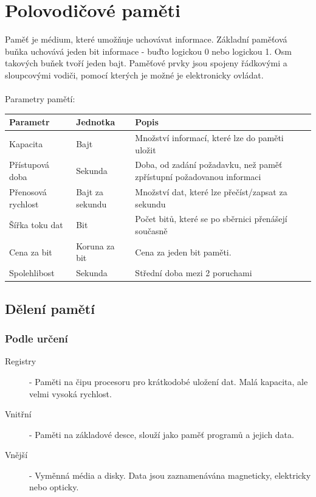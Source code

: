 \section{Polovodičové paměti}
\label{sec:polpameti}
Paměť je médium, které umožňuje uchovávat informace.
Základní paměťová buňka uchovává jeden bit informace - buďto logickou 0 nebo logickou 1.
Osm takových buňek tvoří jeden bajt.
Paměťové prvky jsou spojeny řádkovými a sloupcovými vodiči, pomocí kterých je možné je elektronicky ovládat.\\ \\
Parametry pamětí: \\
\begin{tabularx}{\linewidth}{l|l|l}
  \textbf{Parametr}  & \textbf{Jednotka} & \textbf{Popis}                                                        \\
  \hline
  Kapacita           & Bajt              & Množství informací, které lze do paměti uložit                        \\
  \hline
  Přístupová doba    & Sekunda           & Doba, od zadání požadavku, než paměť zpřístupní požadovanou informaci \\
  \hline
  Přenosová rychlost & Bajt za sekundu   & Množství dat, které lze přečíst/zapsat za sekundu                     \\
  \hline
  Šířka toku dat     & Bit               & Počet bitů, které se po sběrnici přenášejí současně                   \\
  \hline
  Cena za bit        & Koruna za bit     & Cena za jeden bit paměti.                                             \\
  \hline
  Spolehlibost       & Sekunda           & Střední doba mezi 2 poruchami                                         \\
\end{tabularx}
\subsection{Dělení pamětí}
\subsubsection{Podle určení}
\begin{description}
  \item[Registry] - Paměti na čipu procesoru pro krátkodobé uložení dat.
    Malá kapacita, ale velmi vysoká rychlost.
  \item[Vnitřní] - Paměti na základové desce, slouží jako paměť programů a jejich data.
  \item[Vnější] - Vyměnná média a disky.
    Data jsou zaznamenávána magneticky, elektricky nebo opticky.
\end{description}
